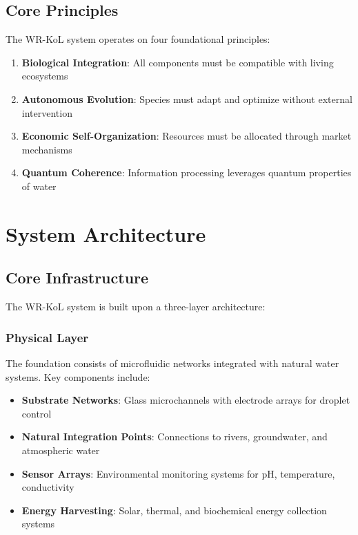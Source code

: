 \documentclass[11pt,a4paper]{article}
\begin{document}
\subsection{Core Principles}

The WR-KoL system operates on four foundational principles:

\begin{enumerate}
    \item \textbf{Biological Integration}: All components must be compatible with living ecosystems
    \item \textbf{Autonomous Evolution}: Species must adapt and optimize without external intervention
    \item \textbf{Economic Self-Organization}: Resources must be allocated through market mechanisms
    \item \textbf{Quantum Coherence}: Information processing leverages quantum properties of water
\end{enumerate}

\section{System Architecture}

\subsection{Core Infrastructure}

The WR-KoL system is built upon a three-layer architecture:

\subsubsection{Physical Layer}
The foundation consists of microfluidic networks integrated with natural water systems. Key components include:

\begin{itemize}
    \item \textbf{Substrate Networks}: Glass microchannels with electrode arrays for droplet control
    \item \textbf{Natural Integration Points}: Connections to rivers, groundwater, and atmospheric water
    \item \textbf{Sensor Arrays}: Environmental monitoring systems for pH, temperature, conductivity
    \item \textbf{Energy Harvesting}: Solar, thermal, and biochemical energy collection systems
\end{itemize}
\end{document}
